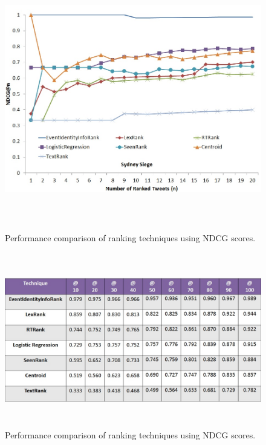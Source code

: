 \begin{figure}[htbp]
\centering
\includegraphics[height=4.5in,width=6in]{Figures/EventIdentityInfoRankPerformanceSydneySiege.jpg}
\caption{\small Performance comparison of ranking techniques using NDCG scores.}
\label{sydneysiegendcg}
\end{figure}






\begin{figure}[htbp]
\centering
\includegraphics[height=3in,width=5.5in]{Figures/MillionsMarchNycCorrectedNDCG.jpg}
\caption{\small Performance comparison of ranking techniques using NDCG scores.}
\label{millionsmarchndcgtable}
\end{figure}

